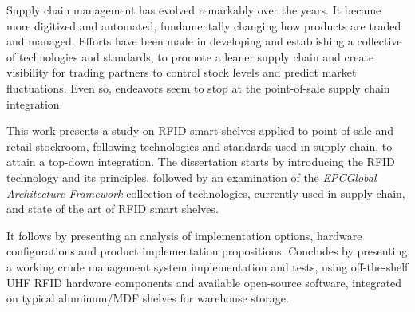 Supply chain management has evolved remarkably over the years. It became more digitized and automated, fundamentally changing how products are traded and managed. Efforts have been made in developing and establishing a collective of technologies and standards, to promote a leaner supply chain and create visibility for trading partners to control stock levels and predict market fluctuations.
Even so, endeavors seem to stop at the point-of-sale supply chain integration. 

This work presents a study on RFID smart shelves applied to point of sale and retail stockroom, following technologies and standards used in supply chain, to attain a top-down integration.
The dissertation starts by introducing the RFID technology and its principles,
followed by an examination of the \emph{EPCGlobal Architecture Framework} collection of technologies, currently used in supply chain, and state of the art of RFID smart shelves.

It follows by presenting an analysis of implementation options, hardware configurations and product implementation propositions.
Concludes by presenting a working crude management system implementation and tests, using off-the-shelf UHF RFID hardware components and available open-source software, integrated on typical aluminum/MDF shelves for warehouse storage.